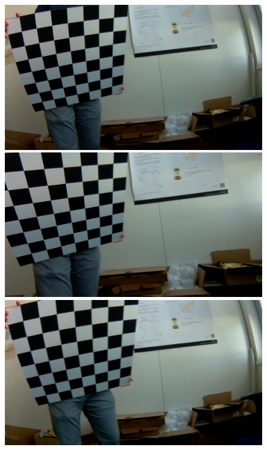 \begin{figure}[H]
     \centering
     \captionsetup{justification=centering}
     \begin{minipage}[t]{0.24\textwidth}
        \centering
        \includegraphics[width=.95\textwidth]{image/3/rec_1/931_og.png}
     \end{minipage}%
     \begin{minipage}[t]{0.24\textwidth}
        \centering
        \includegraphics[width=.95\textwidth]{image/3/rec_1/931_undist.png}
     \end{minipage}
     \begin{minipage}[t]{0.24\textwidth}
        \centering
        \includegraphics[width=.95\textwidth]{image/3/rec_1/940_og.png}

\end{minipage}
\end{figure}
